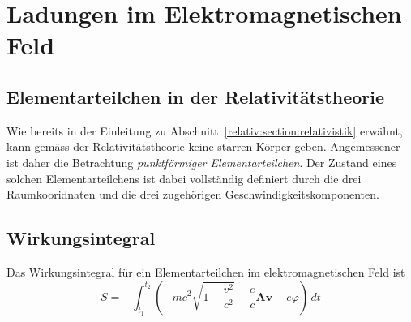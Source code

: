 
\section{Ladungen im Elektromagnetischen Feld 
\label{relativ:section:em_feld}}

\subsection{Elementarteilchen in der Relativitätstheorie 
\label{relativ:section:elementarteilchen}}

Wie bereits in der Einleitung zu Abschnitt~\ref{relativ:section:relativistik} erwähnt,
kann gemäss der Relativitätstheorie keine starren Körper geben.
Angemessener ist daher die Betrachtung \emph{punktförmiger Elementarteilchen}.
Der Zustand eines solchen Elementarteilchens ist dabei vollständig definiert durch
die drei Raumkooridnaten und die drei zugehörigen Geschwindigkeitskomponenten.

\subsection{ Wirkungsintegral 
\label{relativ:section:wirkungsintegral}}

Das Wirkungsintegral für ein Elementarteilchen im elektromagnetischen Feld ist
\begin{equation}
    S = - \int_{t_1}^{t_2} \left( -mc^2 \sqrt{1-\frac{v^2}{c^2}} + \frac{e}{c} \mathbf{A} \mathbf{v} - e \varphi \right) \, dt
\end{equation}
